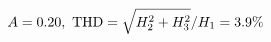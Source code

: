 \documentclass[preview]{standalone}
\begin{document}
\begin{align*}
\special{dvisvgm:raw <g id='unique000'>}A=0.20,\ \text{THD}=\sqrt{H_2^2+H_3^2}/H_1=3.9\%\special{dvisvgm:raw </g>}
\end{align*}
\end{document}
